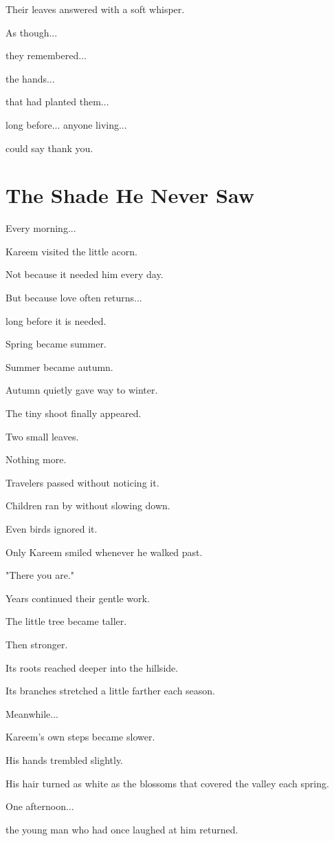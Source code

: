 \documentclass[12pt,openany]{book}
\begin{document}
Their leaves answered with a soft whisper.

As though...

they remembered...

the hands...

that had planted them...

long before...
anyone living...

could say thank you.
\section*{The Shade He Never Saw}

Every morning...

Kareem visited the little acorn.

Not because it needed him every day.

But because love often returns...

long before it is needed.

Spring became summer.

Summer became autumn.

Autumn quietly gave way to winter.

The tiny shoot finally appeared.

Two small leaves.

Nothing more.

Travelers passed without noticing it.

Children ran by without slowing down.

Even birds ignored it.

Only Kareem smiled whenever he walked past.

"There you are."

Years continued their gentle work.

The little tree became taller.

Then stronger.

Its roots reached deeper into the hillside.

Its branches stretched a little farther each season.

Meanwhile...

Kareem's own steps became slower.

His hands trembled slightly.

His hair turned as white as the blossoms that covered the valley each spring.

One afternoon...

the young man who had once laughed at him returned.
\end{document}
